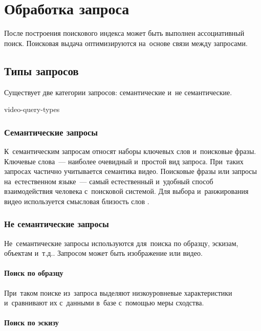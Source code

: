
\section{Обработка запроса}

После построения поискового индекса может быть выполнен ассоциативный поиск.
Поисковая выдача оптимизируются на~основе связи между запросами.

\subsection{Типы запросов}


Существует две категории запросов:
семантические и~не семантические.


\begin{figuredt}
    {video-query-types}
\end{figuredt}


\subsubsection{Семантические запросы}


К~семантическим запросам относят наборы ключевых слов
и~поисковые фразы.
Ключевые слова~— наиболее очевидный и~простой вид запроса.
При~таких запросах частично учитывается семантика видео.
Поисковые фразы или запросы на~естественном языке~—
самый естественный и~удобный способ взаимодействия
человека с~поисковой системой. Для выбора и~ранжирования видео
используется смысловая близость слов \cite{Aytar:2008}.

\subsubsection{Не семантические запросы}

Не~семантические запросы используются для~поиска по образцу,
эскизам, объектам и~т.д..
Запросом может быть изображение или видео.

\paragraph{Поиск по образцу}

При~таком поиске из~запроса выделяют низкоуровневые характеристики
и~сравнивают их с~данными в~базе с~помощью меры сходства.

\paragraph{Поиск по эскизу}

